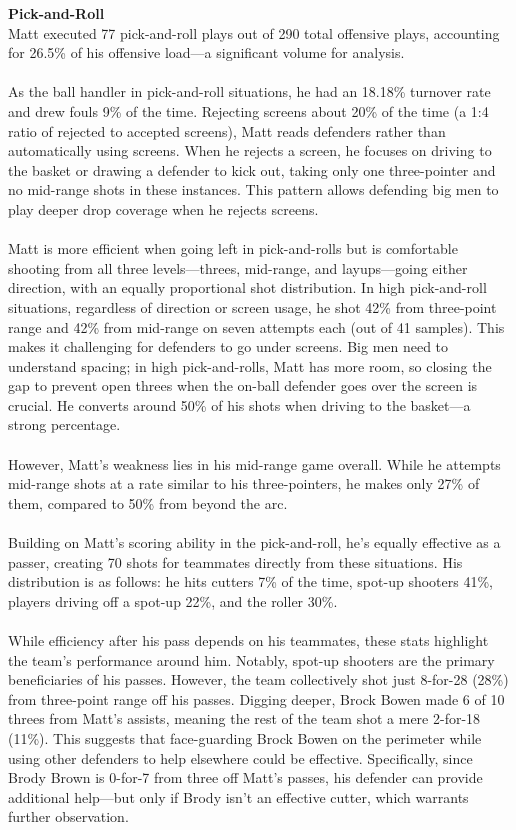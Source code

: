 \documentclass[a4paper,12pt]{article}
\begin{document}
\begin{multicols}{2}

    {\large \noindent \textbf{Pick-and-Roll}} \\
    Matt executed 77 pick-and-roll plays out of 290 total offensive plays, accounting for 26.5\% of his offensive load—a significant volume for analysis.\\ \\
    As the ball handler in pick-and-roll situations, he had an 18.18\% turnover rate and drew fouls 9\% of the time. Rejecting screens about 20\% of the time (a 1:4 ratio of rejected to accepted screens), Matt reads defenders rather than automatically using screens. When he rejects a screen, he focuses on driving to the basket or drawing a defender to kick out, taking only one three-pointer and no mid-range shots in these instances. This pattern allows defending big men to play deeper drop coverage when he rejects screens. \\ \\
    Matt is more efficient when going left in pick-and-rolls but is comfortable shooting from all three levels—threes, mid-range, and layups—going either direction, with an equally proportional shot distribution.
    In high pick-and-roll situations, regardless of direction or screen usage, he shot 42\% from three-point range and 42\% from mid-range on seven attempts each (out of 41 samples). This makes it challenging for defenders to go under screens. Big men need to understand spacing; in high pick-and-rolls, Matt has more room, so closing the gap to prevent open threes when the on-ball defender goes over the screen is crucial. He converts around 50\% of his shots when driving to the basket—a strong percentage. \\ \\
    However, Matt's weakness lies in his mid-range game overall. While he attempts mid-range shots at a rate similar to his three-pointers, he makes only 27\% of them, compared to 50\% from beyond the arc. \\ \\
    Building on Matt's scoring ability in the pick-and-roll, he's equally effective as a passer, creating 70 shots for teammates directly from these situations. His distribution is as follows: he hits cutters 7\% of the time, spot-up shooters 41\%, players driving off a spot-up 22\%, and the roller 30\%. \\ \\
    While efficiency after his pass depends on his teammates, these stats highlight the team's performance around him. Notably, spot-up shooters are the primary beneficiaries of his passes. However, the team collectively shot just 8-for-28 (28\%) from three-point range off his passes. Digging deeper, Brock Bowen made 6 of 10 threes from Matt's assists, meaning the rest of the team shot a mere 2-for-18 (11\%). This suggests that face-guarding Brock Bowen on the perimeter while using other defenders to help elsewhere could be effective. Specifically, since Brody Brown is 0-for-7 from three off Matt's passes, his defender can provide additional help—but only if Brody isn't an effective cutter, which warrants further observation. \\ \\

\end{multicols}
\end{document}
